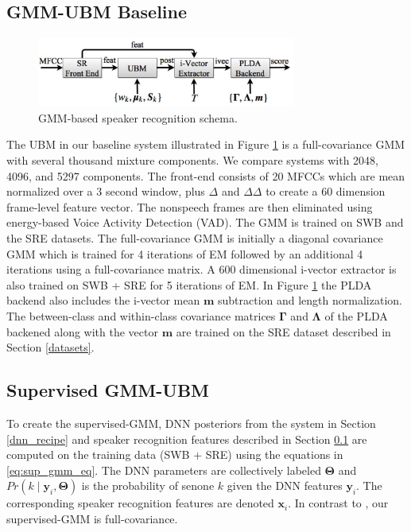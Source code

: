 \documentclass{article}
\begin{document}
\subsection{GMM-UBM Baseline}
\label{gmm_sys}

\begin{figure}[th]
\centerline{\includegraphics[width=8.5cm]{fig/baseline_schema}}
\caption{GMM-based speaker recognition schema.}
\label{fig:gmm_schema}
\end{figure}

The UBM in our baseline system illustrated in Figure \ref{fig:gmm_schema} 
is a full-covariance
GMM with several thousand mixture components. We compare systems with
2048, 4096, and 5297 components. The front-end consists of 20 MFCCs which
are mean normalized over a 3 second window, plus $\Delta$ 
and $\Delta \Delta$ to create a 60 dimension frame-level feature vector.
The nonspeech frames are then eliminated using
energy-based Voice Activity Detection (VAD). The GMM is trained on SWB
and the SRE datasets. The 
full-covariance GMM is initially a diagonal
covariance GMM which is trained for 4 iterations of EM followed by
an additional 4 iterations using a full-covariance matrix.
 A 600 dimensional i-vector extractor is also trained on 
SWB + SRE for 5 iterations of EM. In Figure \ref{fig:gmm_schema} the PLDA
backend also includes the i-vector mean $\boldsymbol{m}$ subtraction and
length normalization. The between-class and within-class
covariance matrices $\boldsymbol{\Gamma}$ and $\boldsymbol{\Lambda}$ of the PLDA backened along with
the vector $\boldsymbol{m}$ are trained on the SRE dataset described 
in Section \ref{datasets}.

\subsection{Supervised GMM-UBM}
\label{sup_gmm_sys}

To create the supervised-GMM, DNN posteriors from the system in Section \ref{dnn_recipe}
and speaker recognition
features described in Section \ref{gmm_sys} are computed on the training data (SWB + SRE)
 using the
equations in \ref{eq:sup_gmm_eq}. The DNN parameters are collectively
labeled $\boldsymbol{\Theta}$ and 
$Pr(k \mid \boldsymbol{y}_{i}, \boldsymbol{\Theta})$ is the
probability of senone $k$ given the DNN features $\boldsymbol{y}_{i}$. The
corresponding speaker recognition features are denoted $\boldsymbol{x}_{i}$.
In contrast to \cite{lei2014}, our supervised-GMM is full-covariance.
\end{document}
